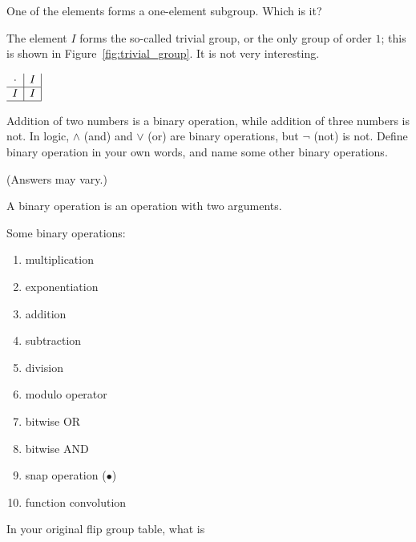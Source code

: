 \documentclass[../gatm_answers.tex]{subfiles}
\begin{document}
\begin{outer_problem}
\item One of the elements forms a one-element subgroup. Which is it?
\end{outer_problem}

The element $I$ forms the so-called trivial group, or the only group of order $1$; this is shown in Figure~\ref{fig:trivial_group}. It is not very interesting.
\begin{center}
$\begin{array}{c|c|}
\cdot & I \\ \hline
I & I \\ \hline
\end{array}$
\label{fig:trivial_group}
\end{center}

\begin{outer_problem}
\item Addition of two numbers is a binary operation, while addition of three numbers is not. In logic, $\land$ (and) and $\lor$ (or) are binary operations, but $\lnot$ (not) is not. Define binary operation in your own words, and name some other binary operations.
\end{outer_problem}

(Answers may vary.)

A binary operation is an operation with two arguments.

Some binary operations:
\begin{multicols}{4}
\begin{enumerate}
\item multiplication
\item exponentiation
\item addition
\item subtraction
\item division
\item modulo operator
\item bitwise OR
\item bitwise AND
\item snap operation ($\bullet$)
\item function convolution
\end{enumerate}
\end{multicols}

\begin{outer_problem}
\item In your original flip group table, what is
\end{outer_problem}
\end{document}
